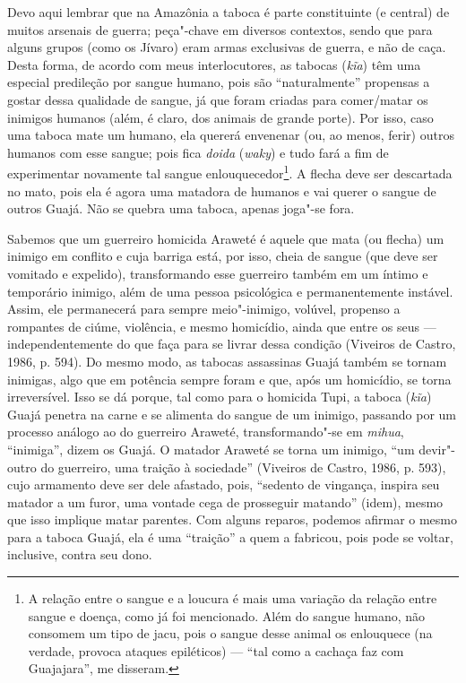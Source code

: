 Devo aqui lembrar que na Amazônia a taboca é parte constituinte (e
central) de muitos arsenais de guerra; peça"-chave em diversos contextos,
sendo que para alguns grupos (como os Jívaro) eram armas exclusivas de
guerra, e não de caça. Desta forma, de acordo com meus interlocutores,
as tabocas (\emph{kĩa}) têm uma especial predileção por sangue humano,
pois são ``naturalmente'' propensas a gostar dessa qualidade de sangue, já
que foram criadas para comer/matar os inimigos humanos (além, é claro,
dos animais de grande porte). Por isso, caso uma taboca mate um humano,
ela quererá envenenar (ou, ao menos, ferir) outros humanos com esse
sangue; pois fica \emph{doida} (\emph{waky}) e tudo fará a fim de
experimentar novamente tal sangue enlouquecedor\footnote{A relação entre
  o sangue e a loucura é mais uma variação da relação entre sangue e
  doença, como já foi mencionado. Além do sangue humano, não consomem um
  tipo de jacu, pois o sangue desse animal os enlouquece (na verdade,
  provoca ataques epiléticos) --- ``tal como a cachaça faz com Guajajara'',
  me disseram.}. A flecha deve ser descartada no mato, pois ela é agora
uma matadora de humanos e vai querer o sangue de outros Guajá. Não se
quebra uma taboca, apenas joga"-se fora.

Sabemos que um guerreiro homicida Araweté é aquele que mata (ou flecha)
um inimigo em conflito e cuja barriga está, por isso, cheia de sangue
(que deve ser vomitado e expelido), transformando esse guerreiro também
em um íntimo e temporário inimigo, além de uma pessoa psicológica e
permanentemente instável. Assim, ele permanecerá para sempre
meio"-inimigo, volúvel, propenso a rompantes de ciúme, violência, e mesmo
homicídio, ainda que entre os seus --- independentemente do que faça para
se livrar dessa condição (Viveiros de Castro, 1986, p. 594). Do mesmo
modo, as tabocas assassinas Guajá também se tornam inimigas, algo que em
potência sempre foram e que, após um homicídio, se torna irreversível.
Isso se dá porque, tal como para o homicida Tupi, a taboca (\emph{kĩa})
Guajá penetra na carne e se alimenta do sangue de um inimigo, passando
por um processo análogo ao do guerreiro Araweté, transformando"-se em
\emph{mihua}, ``inimiga'', dizem os Guajá. O matador Araweté se torna um
inimigo, ``um devir"-outro do guerreiro, uma traição à sociedade''
(Viveiros de Castro, 1986, p. 593), cujo armamento deve ser dele
afastado, pois, ``sedento de vingança, inspira seu matador a um furor,
uma vontade cega de prosseguir matando'' (idem), mesmo que isso implique
matar parentes. Com alguns reparos, podemos afirmar o mesmo para a
taboca Guajá, ela é uma ``traição'' a quem a fabricou, pois pode se
voltar, inclusive, contra seu dono.

